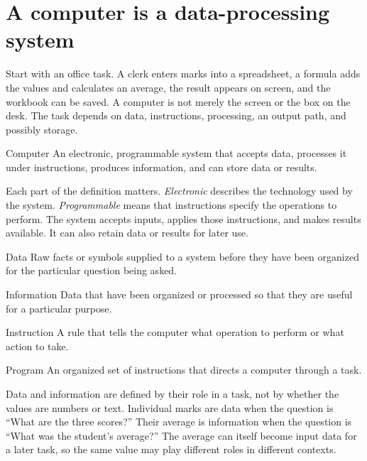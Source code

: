 \section{A computer is a data-processing system}
Start with an office task. A clerk enters marks into a spreadsheet, a formula
adds the values and calculates an average, the result appears on screen, and
the workbook can be saved. A computer is not merely the screen or the box on
the desk. The task depends on data, instructions, processing, an output path,
and possibly storage.

\begin{definitionbox}{Computer}
An electronic, programmable system that accepts data, processes it under
instructions, produces information, and can store data or results.
\end{definitionbox}

Each part of the definition matters. \emph{Electronic} describes the
technology used by the system. \emph{Programmable} means that instructions
specify the operations to perform. The system accepts inputs, applies those
instructions, and makes results available. It can also retain data or results
for later use.

\begin{definitionbox}{Data}
Raw facts or symbols supplied to a system before they have been organized for
the particular question being asked.
\end{definitionbox}

\begin{definitionbox}{Information}
Data that have been organized or processed so that they are useful for a
particular purpose.
\end{definitionbox}

\begin{definitionbox}{Instruction}
A rule that tells the computer what operation to perform or what action to
take.
\end{definitionbox}

\begin{definitionbox}{Program}
An organized set of instructions that directs a computer through a task.
\end{definitionbox}

Data and information are defined by their role in a task, not by whether the
values are numbers or text. Individual marks are data when the question is
``What are the three scores?'' Their average is information when the question
is ``What was the student's average?'' The average can itself become input
data for a later task, so the same value may play different roles in
different contexts.

